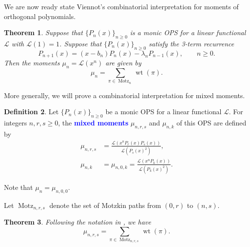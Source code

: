 \documentclass[oneside]{book}
\numberwithin{equation}{section}
\newtheorem{thm}{Theorem}[section]
\theoremstyle{definition}
\newtheorem{defn}[thm]{Definition}
\newcommand\Motz{\operatorname{Motz}}
\newcommand\LL{\mathcal{L}}
\newcommand\wt{\operatorname{wt}}
\renewcommand\emph[1]{\textcolor{blue}{\bf #1}}
\begin{document}
We are now ready state Viennot's combinatorial interpretation for
moments of orthogonal polynomials.

\begin{thm}\label{thm:mu=Mot}
  Suppose that \( \{ P_n(x) \}_{n\ge 0} \) is a monic OPS for a
  linear functional \( \LL \) with \( \LL(1)=1 \). Suppose that
  \( \{ P_n(x) \}_{n\ge 0} \) satisfy the 3-term recurrence
  \[
      P_{n+1}(x) = (x-b_n) P_n(x) - \lambda_n P_{n-1}(x), \qquad n\ge0.
  \]
  Then the moments \( \mu_n=\LL(x^n) \) are given by
\[
  \mu_n = \sum_{\pi\in \Motz_n} \wt(\pi).
\]
\end{thm}

More generally, we will prove
a combinatorial interpretation for mixed moments.

\begin{defn}\label{def:mixed_moment}
  Let \( \{ P_n(x) \}_{n\ge 0} \) be a monic OPS for a linear
  functional \( \LL \). For integers \( n,r,s\ge0 \), the \emph{mixed
    moments} \( \mu_{n,r,s} \) and \( \mu_{n,k} \) of this OPS are
  defined by
  \begin{align*}
    \mu_{n,r,s} &= \frac{\LL(x^n P_r(x)P_s(x))}{\LL(P_s(x)^2)},\\
    \mu_{n,k} &= \mu_{n,0,k} = \frac{\LL(x^n P_k(x))}{\LL(P_k(x)^2)}.
  \end{align*}
\end{defn}

Note that \( \mu_n = \mu_{n,0,0} \).

Let \( \Motz_{n,r,s} \) denote the set of Motzkin paths from
\( (0,r) \) to \( (n,s) \). 

\begin{thm}\label{thm:mu=Mot_nrs}
  Following the notation in , we have
\[
  \mu_{n,r,s} = \sum_{\pi\in \Motz_{n,r,s}} \wt(\pi).
\]
\end{thm}
\end{document}
